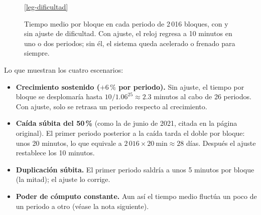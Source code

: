 \documentclass[11pt,a4paper]{article}
\newcommand{\fuentedatos}[1]{\par\smallskip{\footnotesize\textit{Datos:}~\texttt{\detokenize{#1}}}}
\begin{document}
\begin{figure}[tbp]

\smallskip
\ref{leg-dificultad}
\caption{Tiempo medio por bloque en cada periodo de 2\,016 bloques, con y sin ajuste de dificultad. Con ajuste, el reloj regresa a 10 minutos en uno o dos periodos; sin él, el sistema queda acelerado o frenado para siempre.}\label{fig:ajuste}
\fuentedatos{data/difficulty_sim.csv}
\end{figure}

Lo que muestran los cuatro escenarios:
\begin{itemize}[leftmargin=1.4em,itemsep=2pt]
  \item \textbf{Crecimiento sostenido ($+6\,\%$ por periodo).} Sin ajuste, el tiempo por bloque se desplomaría hasta $10/1.06^{25}\approx 2.3$ minutos al cabo de 26 periodos. Con ajuste, solo se retrasa un periodo respecto al crecimiento.
  \item \textbf{Caída súbita del 50\,\%} (como la de junio de 2021, citada en la página original). El primer periodo posterior a la caída tarda el doble por bloque: unos 20 minutos, lo que equivale a $2\,016\times 20\ \text{min}\approx 28$ días. Después el ajuste restablece los 10 minutos.
  \item \textbf{Duplicación súbita.} El primer periodo saldría a unos 5 minutos por bloque (la mitad); el ajuste lo corrige.
  \item \textbf{Poder de cómputo constante.} Aun así el tiempo medio fluctúa un poco de un periodo a otro (véase la nota siguiente).
\end{itemize}
\end{document}
